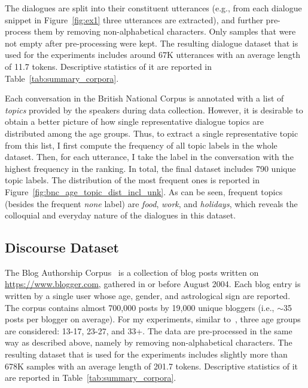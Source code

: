 The dialogues are split into their constituent utterances (e.g., from each dialogue snippet in Figure~\ref{fig:ex1} three utterances are extracted), and further pre-process them by removing non-alphabetical characters.
Only samples that were not empty after pre-processing were kept.
The resulting dialogue dataset that is used for the experiments includes around 67K utterances with an average length of 11.7 tokens. Descriptive statistics of it are reported in Table~\ref{tab:summary_corpora}.

Each conversation in the British National Corpus is annotated with a list of \emph{topics} provided by the speakers during data collection. However, it is desirable to obtain a better picture of how single representative dialogue topics are distributed among the age groups.
Thus, to extract a single representative topic from this list, I first compute the frequency of all topic labels in the whole dataset. Then, for each utterance, I take the label in the conversation with the highest frequency in the ranking.
In total, the final dataset includes 790 unique topic labels. The distribution of the most frequent ones is reported in Figure~\ref{fig:bnc_age_topic_dist_incl_unk}. As can be seen, frequent topics (besides the frequent \emph{none} label) are \emph{food}, \emph{work}, and \emph{holidays}, which reveals the colloquial and everyday nature of the dialogues in this dataset.

\subsection{Discourse Dataset}
The Blog Authorship Corpus~\citep{schler2006effects} is a collection of blog posts
written on \url{https://www.blogger.com}, gathered in or before August 2004. %
Each blog entry is
written by a single user
whose age, gender, and astrological sign are reported.
The corpus contains almost 700,000 posts by 19,000 unique bloggers (i.e., $\sim$35 posts per blogger on average).
For my experiments, similar to~\citet{schler2006effects},
three age groups are considered: 13-17, 23-27, and 33+. The data are pre-processed in the same way as described above, namely by removing non-alphabetical characters. The resulting dataset that is used for the experiments includes slightly more than 678K samples with an average length of 201.7 tokens. Descriptive statistics of it are reported in Table~\ref{tab:summary_corpora}. 

